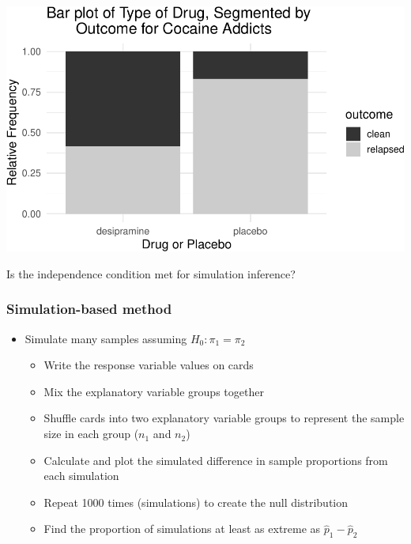 \documentclass[
]{report}
\begin{document}
\begin{center}\includegraphics[width=0.6\linewidth]{08-VN08-two-cat-simulation_files/figure-latex/unnamed-chunk-13-1} \end{center}

Is the independence condition met for simulation inference?

\vspace{0.4in}

\subsubsection*{Simulation-based method}\label{simulation-based-method}

\begin{itemize}
\item
  Simulate many samples assuming \(H_0: \pi_1 = \pi_2\)

  \begin{itemize}
  \item
    Write the response variable values on cards
  \item
    Mix the explanatory variable groups together
  \item
    Shuffle cards into two explanatory variable groups to represent the sample size in each group (\(n_1\) and \(n_2\))
  \item
    Calculate and plot the simulated difference in sample proportions from each simulation
  \item
    Repeat 1000 times (simulations) to create the null distribution
  \item
    Find the proportion of simulations at least as extreme as \(\hat{p}_1 - \hat{p}_2\)
  \end{itemize}
\end{itemize}
\end{document}
